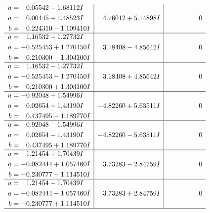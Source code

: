 \documentclass[1p]{elsarticle_modified}
\theoremstyle{definition}
\begin{document}
$$\begin{array}{c|c|c}
\begin{aligned}
u &= \phantom{-}0.05542 - 1.68112 I \\
a &= \phantom{-}0.00445 + 1.48523 I \\
b &= \phantom{-}0.224310 - 1.109410 I\end{aligned}
 & \phantom{-}4.76012 + 5.14898 I & \phantom{-0.000000 } 0 \\ \hline\begin{aligned}
u &= \phantom{-}1.16532 + 1.27732 I \\
a &= -0.525453 + 1.270450 I \\
b &= -0.210300 - 1.303100 I\end{aligned}
 & \phantom{-}3.18408 - 4.85642 I & \phantom{-0.000000 } 0 \\ \hline\begin{aligned}
u &= \phantom{-}1.16532 - 1.27732 I \\
a &= -0.525453 - 1.270450 I \\
b &= -0.210300 + 1.303100 I\end{aligned}
 & \phantom{-}3.18408 + 4.85642 I & \phantom{-0.000000 } 0 \\ \hline\begin{aligned}
u &= -0.92048 + 1.54996 I \\
a &= \phantom{-}0.02654 + 1.43190 I \\
b &= \phantom{-}0.437495 - 1.189770 I\end{aligned}
 & -4.82260 + 5.63511 I & \phantom{-0.000000 } 0 \\ \hline\begin{aligned}
u &= -0.92048 - 1.54996 I \\
a &= \phantom{-}0.02654 - 1.43190 I \\
b &= \phantom{-}0.437495 + 1.189770 I\end{aligned}
 & -4.82260 - 5.63511 I & \phantom{-0.000000 } 0 \\ \hline\begin{aligned}
u &= \phantom{-}1.21454 + 1.70439 I \\
a &= -0.082444 + 1.057460 I \\
b &= -0.230777 - 1.114510 I\end{aligned}
 & \phantom{-}3.73283 - 2.84759 I & \phantom{-0.000000 } 0 \\ \hline\begin{aligned}
u &= \phantom{-}1.21454 - 1.70439 I \\
a &= -0.082444 - 1.057460 I \\
b &= -0.230777 + 1.114510 I\end{aligned}
 & \phantom{-}3.73283 + 2.84759 I & \phantom{-0.000000 } 0\\
 \hline 
 \end{array}$$\newpage
\end{document}
